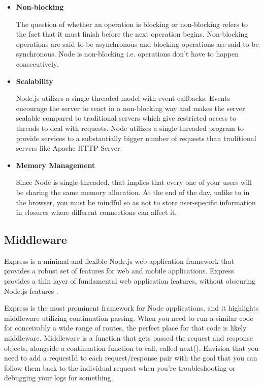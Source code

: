 \documentclass[../thesis.tex]{subfiles}
\begin{document}
\begin{itemize}
    \item \textbf{Non-blocking}
    \newline
    
    The question of whether an operation is blocking or non-blocking refers to the fact that it must finish before the next operation begins. Non-blocking operations are said to be asynchronous and blocking operations are said to be synchronous. Node is non-blocking i.e. operations don't have to happen consecutively.
    \newline
    
    \item \textbf{Scalability}
    \newline
    
    Node.js utilizes a single threaded model with event callbacks. Events encourage the server to react in a non-blocking way and makes the server scalable compared to traditional servers which give restricted access to threads to deal with requests. Node utilizes a single threaded program to provide services to a substantially bigger number of requests than traditional servers like Apache HTTP Server.
    \newline
    
    \item \textbf{Memory Management}
    \newline
    
    Since Node is single-threaded, that implies that every one of your users will be sharing the same memory allocation. At the end of the day, unlike to in the browser, you must be mindful so as not to store user-specific information in closures where different connections can affect it.
\end{itemize}
\subsection*{Middleware}
Express is a minimal and flexible Node.js web application framework that provides a robust set of features for web and mobile applications.  Express provides a thin layer of fundamental web application features, without obscuring Node.js features \cite{express}.
\newline

Express is the most prominent framework for Node applications, and it highlights middleware utilizing continuation passing. When you need to run a similar code for conceivably a wide range of routes, the perfect place for that code is likely middleware. 
Middleware is a function that gets passed the request and response objects, alongside a continuation function to call, called next(). Envision that you need to add a requestId to each request/response pair with the goal that you can follow them back to the individual request when you're troubleshooting or debugging your logs for something.
\newline
\end{document}
